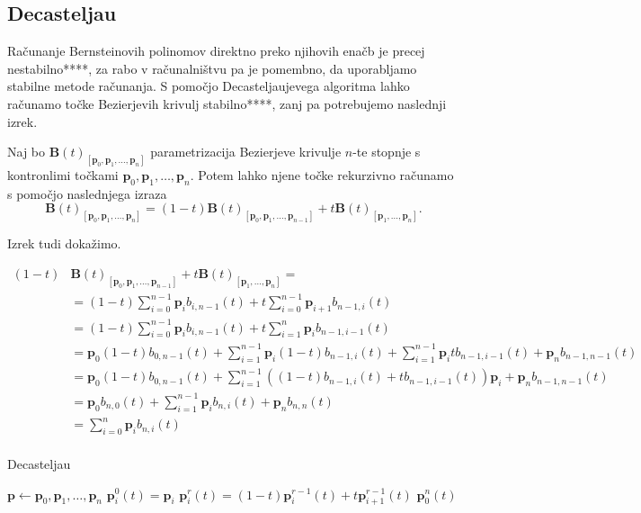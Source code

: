 \documentclass[isrm2, tisk]{fmfdelo}
\newcommand{\p}{\textbf{p}}
\newcommand{\lilb}[2]{b_{#1,#2}(t)}
\newcommand{\bigbbt}{\textbf{B}(t)}
\newcommand{\bernsteinsump}[2]{\sum_{#1=0}^{#2} \p_{#1}\lilb{#1}{#2}}
\begin{document}
    \subsection{Decasteljau}
    Računanje Bernsteinovih polinomov direktno preko njihovih enačb je precej nestabilno****, za rabo v računalništvu pa je pomembno, da uporabljamo stabilne metode računanja.
    S pomočjo Decasteljaujevega algoritma lahko računamo točke Bezierjevih krivulj stabilno****, zanj pa potrebujemo naslednji izrek.

    \begin{izrek}
        Naj bo $\bigbbt_{[\p_0,\p_1,\dots,\p_n]}$ parametrizacija Bezierjeve krivulje $n$-te stopnje s kontronlimi točkami $\p_0,\p_1,\dots,\p_n$.
        Potem lahko njene točke rekurzivno računamo s pomočjo naslednjega izraza \[\bigbbt_{[\p_0,\p_1,\dots,\p_n]} = (1-t)\bigbbt_{[\p_0,\p_1,\dots,\p_{n-1}]} +t\bigbbt_{[\p_1,\dots,\p_n]}.\]
    \end{izrek}

    Izrek tudi dokažimo.

    \begin{dokaz}
        \begin{align*}
        (1-t)
            &
            \bigbbt_{[\p_0,\p_1,\dots,\p_{n-1}]}+t\bigbbt_{[\p_1,\dots,\p_n]} = \\
            &= (1-t)\bernsteinsump{i}{n-1}+t\sum_{i=0}^{n-1} \p_{i+1}\lilb{n-1}{i} \\
            &= (1-t)\bernsteinsump{i}{n-1}+ t\sum_{i=1}^{n} \p_{i}\lilb{n-1}{i-1} \\
            &= \p_0(1-t)\lilb{0}{n-1} + \sum_{i=1}^{n-1}\p_{i}(1-t)\lilb{n-1}{i} +  \sum_{i=1}^{n-1} \p_{i}t\lilb{n-1}{i-1} + \p_n \lilb{n-1}{n-1} \\
            &= \p_0(1-t)\lilb{0}{n-1} + \sum_{i=1}^{n-1}\left((1-t)\lilb{n-1}{i} + t\lilb{n-1}{i-1}\right)\p_{i} + \p_n \lilb{n-1}{n-1} \\
            &= \p_0\lilb{n}{0} + \sum_{i=1}^{n-1}\p_{i}\lilb{n}{i} + \p_n \lilb{n}{n} \\
            &= \sum_{i=0}^{n}\p_{i}\lilb{n}{i} \\
        \end{align*}
    \end{dokaz}
    \begin{algorithm}
        \label{alg:decasteljau}
        \caption{Decasteljau}
        \begin{algorithmic}
            \State $\p \gets \p_0,\p_1,\dots,\p_n$
                \State $\p_i^0(t)=\p_i$
            \EndFor
                    \State $\p_i^r(t)=(1-t)\p_i^{r-1}(t)+t\p_{i+1}^{r-1}(t)$
                \EndFor
            \EndFor
            \State \Return $\p_0^n(t)$
        \end{algorithmic}
    \end{algorithm}
\end{document}
